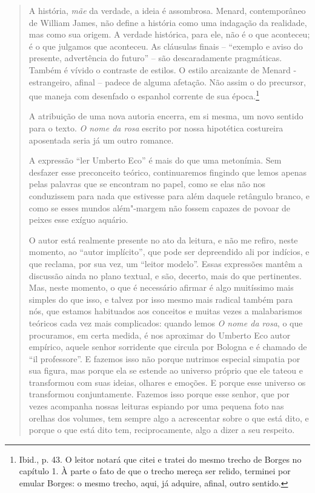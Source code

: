\begin{quote}
A história, \emph{mãe} da verdade, a ideia é assombrosa. Menard,
contemporâneo de William James, não define a história como uma indagação
da realidade, mas como sua origem. A verdade histórica, para ele, não é
o que aconteceu; é o que julgamos que aconteceu. As cláusulas finais --
``exemplo e aviso do presente, advertência do futuro'' -- são
descaradamente pragmáticas. Também é vívido o contraste de estilos. O
estilo arcaizante de Menard - estrangeiro, afinal -- padece de alguma
afetação. Não assim o do precursor, que maneja com desenfado o espanhol
corrente de sua época.\footnote{Ibid., p. 43. O leitor notará que citei
  e tratei do mesmo trecho de Borges no capítulo 1. À parte o fato de
  que o trecho mereça ser relido, terminei por emular Borges: o mesmo
  trecho, aqui, já adquire, afinal, outro sentido.}

A atribuição de uma nova autoria encerra, em si mesma, um novo sentido
para o texto. \emph{O nome da rosa} escrito por nossa hipotética
costureira aposentada seria já um outro romance.

A expressão ``ler Umberto Eco'' é mais do que uma metonímia. Sem
desfazer esse preconceito teórico, continuaremos fingindo que lemos
apenas pelas palavras que se encontram no papel, como se elas não nos
conduzissem para nada que estivesse para além daquele retângulo branco,
e como se esses mundos além"-margem não fossem capazes de povoar de
peixes esse exíguo aquário.

O autor está realmente presente no ato da leitura, e não me refiro,
neste momento, ao ``autor implícito'', que pode ser depreendido ali por
indícios, e que reclama, por sua vez, um ``leitor modelo''. Essas
expressões mantêm a discussão ainda no plano textual, e são, decerto,
mais do que pertinentes. Mas, neste momento, o que é necessário afirmar
é algo muitíssimo mais simples do que isso, e talvez por isso mesmo mais
radical também para nós, que estamos habituados aos conceitos e muitas
vezes a malabarismos teóricos cada vez mais complicados: quando lemos
\emph{O nome da rosa}, o que procuramos, em certa medida, é nos
aproximar do Umberto Eco autor empírico, aquele senhor sorridente que
circula por Bologna e é chamado de ``il professore''. E fazemos isso não
porque nutrimos especial simpatia por sua figura, mas porque ela se
estende ao universo próprio que ele tateou e transformou com suas
ideias, olhares e emoções. E porque esse universo os transformou
conjuntamente. Fazemos isso porque esse senhor, que por vezes acompanha
nossas leituras espiando por uma pequena foto nas orelhas dos volumes,
tem sempre algo a acrescentar sobre o que está dito, e porque o que está
dito tem, reciprocamente, algo a dizer a seu respeito.


\end{quote}
